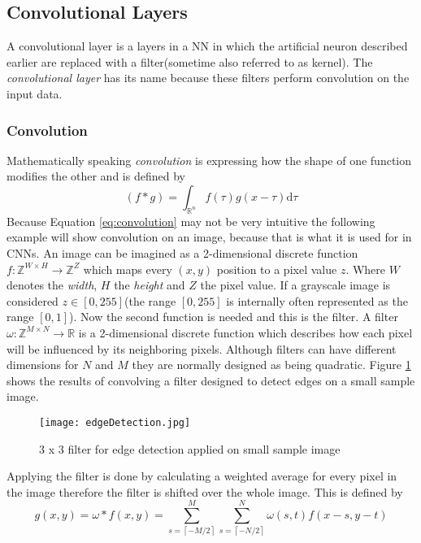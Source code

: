 \subsection{Convolutional Layers}\label{ssec:Conv}
A convolutional layer is a layers in a NN in which the artificial neuron described earlier are replaced with a filter(sometime also referred to as kernel).
The \emph{convolutional layer} has its name because these filters perform convolution on the input data.
\subsubsection{Convolution}\label{ssec:convolution}
Mathematically speaking \emph{convolution} is expressing how the shape of one function modifies the other and is defined by
\begin{equation}\label{eq:convolution}
(f * g) = \int_{\mathbb{R}^n} f(\tau)g(x-\tau)\mathrm{d}\tau
\end{equation}
Because Equation \ref{eq:convolution} may not be very intuitive the following example will show convolution on an image, because that is what it is used for in CNNs.
An image can be imagined as a 2-dimensional discrete function $f: \mathbb{Z}^{W \times H}  \rightarrow \mathbb{Z}^Z$ which maps every $(x,y)$ position to a pixel value $z$.
Where $W$ denotes the \emph{width}, $H$ the \emph{height} and $Z$ the pixel value.
If a grayscale image is considered $z \in [0, 255]$(the range $[0, 255]$ is internally often represented as the range $[0, 1]$).
Now the second function is needed and this is the filter. 
A filter $\omega: \mathbb{Z}^{M \times N}  \rightarrow \mathbb{R}$ is a 2-dimensional discrete function which describes how each pixel will be influenced by its neighboring pixels. Although filters can have different dimensions for $N$ and $M$ they are normally designed as being quadratic.
Figure \ref{fig:filter} shows the results of convolving a filter designed to detect edges on a small sample image.
\begin{figure}
\centering
  \texttt{[image: edgeDetection.jpg]}
  \caption{3 x 3 filter for edge detection applied on small sample image \cite{BRINKMANN200893}
}\label{fig:filter}
\end{figure}
Applying the filter is done by calculating a weighted average for every pixel in the image therefore the filter is shifted over the whole image.
This is defined by
\begin{equation}
g(x,y) = \omega * f(x,y) = \sum_{s=\left \lceil-M/2 \right \rceil}^M \sum_{s=\left \lceil-N/2 \right \rceil}^N \omega(s, t)f(x-s, y-t)
\end{equation}\label{eq:filter}
